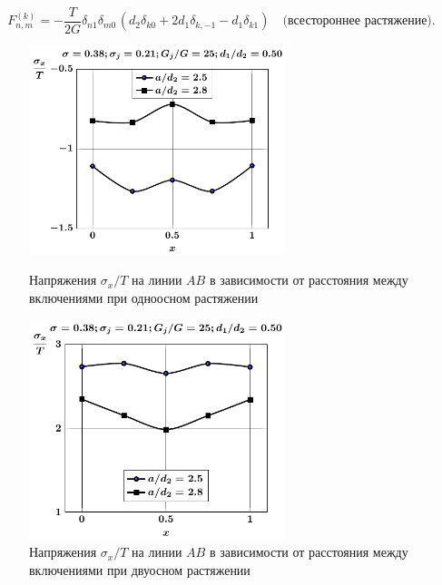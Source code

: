 \begin{equation*}
F_{n,m}^{(k)} =  -\frac{T}{2G}{\delta _{n1}}{\delta _{m0\,}}(d_2\delta_{k0}+2d_1{\delta _{k, - 1}} - d_1{\delta _{k1}})\quad\text{(всестороннее растяжение)}.
\end{equation*}

\begin{figure}[h!]
\centering\footnotesize
\parbox[b]{7.5cm}{\centering\includegraphics[width=7.5cm]{periodic-oblate-inc27-a-d50-g25-t1-sig_x.pdf}
\caption{Напряжения $\sigma_x/T$ на линии $AB$ в зависимости от расстояния между включениями при одноосном растяжении
\label{f:11:43}}}\hfil\hfil
\parbox[b]{7.5cm}{\centering\includegraphics[width=7.5cm]{periodic-oblate-inc27-a-d50-g25-t2-sig_x.pdf}
\caption{Напряжения $\sigma_x/T$ на линии $AB$ в зависимости от расстояния между включениями при двуосном растяжении
\label{f:11:44}}}
\end{figure}

